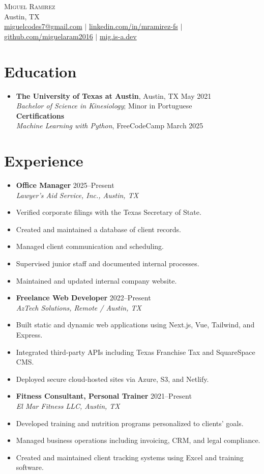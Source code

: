 \documentclass[letterpaper,10pt]{article}
\newcommand{\resumeItem}[1]{\item\small{#1}}
\newcommand{\resumeSubheading}[4]{
  \vspace{-1pt}\item
    \textbf{#1} \hfill #2 \\
    \textit{\small#3} \hfill \textit{\small #4}
}
\begin{document}
\begin{center}
  {\Huge \scshape Miguel Ramirez} \\ \vspace{1pt}
  Austin, TX \\ 
  \href{mailto:miguelcodes7@gmail.com}{miguelcodes7@gmail.com} $|$
  \href{https://linkedin.com/in/mramirez-fs}{linkedin.com/in/mramirez-fs} $|$
  \href{https://github.com/miguelaram2016}{github.com/miguelaram2016} $|$
  \href{https://mig.is-a.dev}{mig.is-a.dev}
\end{center}

\section*{Education}
\begin{itemize}[leftmargin=0.15in]
  \item[]
    \textbf{The University of Texas at Austin}, Austin, TX \hfill May 2021 \\
    \textit{Bachelor of Science in Kinesiology}; Minor in Portuguese \\
    \textbf{Certifications} \\
    \textit{Machine Learning with Python}, FreeCodeCamp \hfill March 2025 \\
\end{itemize}

\section*{Experience}
\begin{itemize}[leftmargin=0.15in]
  \resumeSubheading
    {Office Manager}{2025–Present}
    {Lawyer's Aid Service, Inc., Austin, TX}{}
    \resumeItem{Verified corporate filings with the Texas Secretary of State.}
    \resumeItem{Created and maintained a database of client records.}
    \resumeItem{Managed client communication and scheduling.}
    \resumeItem{Supervised junior staff and documented internal processes.}
    \resumeItem{Maintained and updated internal company website.}

  \resumeSubheading
    {Freelance Web Developer}{2022–Present}
    {AzTech Solutions, Remote / Austin, TX}{}
    \resumeItem{Built static and dynamic web applications using Next.js, Vue, Tailwind, and Express.}
    \resumeItem{Integrated third-party APIs including Texas Franchise Tax and SquareSpace CMS.}
    \resumeItem{Deployed secure cloud-hosted sites via Azure, S3, and Netlify.}

  \resumeSubheading
    {Fitness Consultant, Personal Trainer}{2021–Present}
    {El Mar Fitness LLC, Austin, TX}{}
    \resumeItem{Developed training and nutrition programs personalized to clients' goals.}
    \resumeItem{Managed business operations including invoicing, CRM, and legal compliance.}
    \resumeItem{Created and maintained client tracking systems using Excel and training software.}

\end{itemize}
\end{document}
